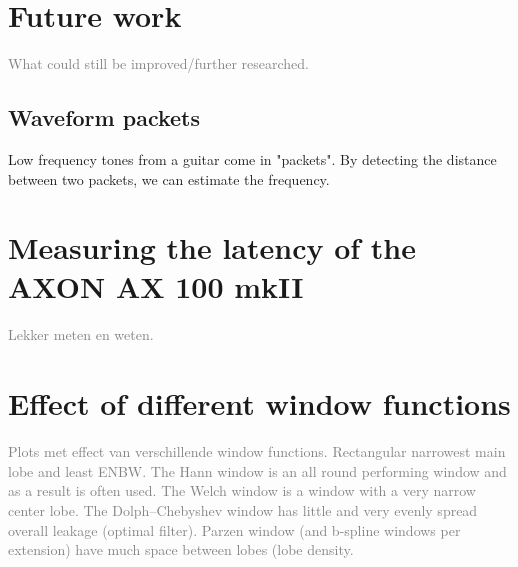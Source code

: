 \documentclass[10pt,twocolumn]{article}
\begin{document}
\section{Future work}  \label{sec:future}
\textcolor{gray}{What could still be improved/further researched.}

\subsection{Waveform packets}  \label{sub:waveform_packet}
Low frequency tones from a guitar come in "packets". By detecting the distance between two packets, we can estimate the frequency.



\appendix
\section{Measuring the latency of the AXON AX 100 mkII}  \label{sec:ax100}
\textcolor{gray}{Lekker meten en weten.}

\section{Effect of different window functions}  \label{sec:windows}
\textcolor{gray}{Plots met effect van verschillende window functions. Rectangular narrowest main lobe and least ENBW. The Hann window is an all round performing window and as a result is often used. The Welch window is a window with a very narrow center lobe. The Dolph–Chebyshev window has little and very evenly spread overall leakage (optimal filter). Parzen window (and b-spline windows per extension) have much space between lobes (lobe density. }
\end{document}
